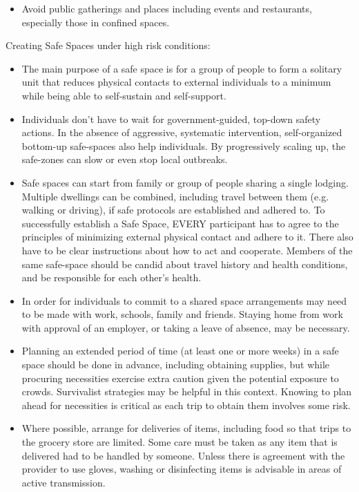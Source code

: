 \documentclass[onecolumn,journal]{IEEEtran}
\begin{document}
\begin{multicols}{2}
\begin{itemize}
\item Avoid public gatherings and places including events and restaurants, especially those in confined spaces.

\end{itemize}

Creating Safe Spaces under high risk conditions:

\begin{itemize}

\item The main purpose of a safe space is for a group of people to form a solitary unit that reduces physical contacts to external individuals to a minimum while being able to self-sustain and self-support.

\item Individuals don't have to wait for government-guided, top-down safety actions. In the absence of aggressive, systematic intervention, self-organized bottom-up safe-spaces also help individuals. By progressively scaling up, the safe-zones can slow or even stop local outbreaks.

\item Safe spaces can start from family or group of people sharing a single lodging. Multiple dwellings can be combined, including travel between them (e.g. walking or driving), if safe protocols are established and adhered to. To successfully establish a Safe Space, EVERY participant has to agree to the principles of minimizing external physical contact and adhere to it. There also have to be clear instructions about how to act and cooperate. Members of the same safe-space should be candid about travel history and health conditions, and be responsible for each other's health.

\item In order for individuals to commit to a shared space arrangements may need to be made with work, schools, family and friends. Staying home from work with approval of an employer, or taking a leave of absence, may be necessary.

\item Planning an extended period of time (at least one or more weeks) in a safe space should be done in advance, including obtaining supplies, but while procuring necessities exercise extra caution given the potential exposure to crowds. Survivalist strategies may be helpful in this context. Knowing to plan ahead for necessities is critical as each trip to obtain them involves some risk. 

\item Where possible, arrange for deliveries of items, including food so that trips to the grocery store are limited. Some care must be taken as any item that is delivered had to be handled by someone. Unless there is agreement with the provider to use gloves, washing or disinfecting items is advisable in areas of active transmission. 


\end{itemize}
\end{multicols}
\end{document}
